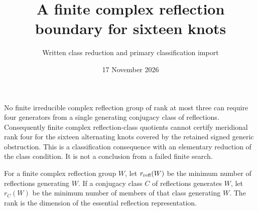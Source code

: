 \documentclass[11pt]{article}
\title{A finite complex reflection boundary for sixteen knots}
\author{Written class reduction and primary classification import}
\date{17 November 2026}
\newcommand{\rr}{r_{\rm refl}}
\begin{document}
\maketitle

No finite irreducible complex reflection group of rank at most three
can require four generators from a single generating conjugacy class
of reflections. Consequently finite complex reflection-class quotients
cannot certify meridional rank four for the sixteen alternating knots
covered by the retained signed generic obstruction. This is a classification consequence with an
elementary reduction of the class condition. It is not a conclusion
from a failed finite search.

For a finite complex reflection group $W$, let $\rr(W)$ be the minimum
number of reflections generating $W$. If a conjugacy class $C$ of
reflections generates $W$, let $r_C(W)$ be the minimum number of
members of that class generating $W$. The rank is the dimension of the
essential reflection representation.
\end{document}
